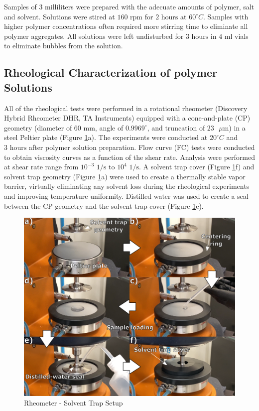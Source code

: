 Samples of 3 milliliters were prepared with the adecuate amounts of polymer, salt and solvent. Solutions were stired at $160 \textrm{ rpm}$ for $2 \textrm{ hours}$ at $60^{\circ}C$. Samples with higher polymer concentrations often required more stirring time to eliminate all polymer aggregates. All solutions were left undisturbed for $3 \textrm{ hours}$ in $4 \textrm{ ml}$ vials to eliminate bubbles from the solution.

\subsection{Rheological Characterization of polymer Solutions}
All of the rheological tests were performed in a rotational rheometer (Discovery Hybrid Rheometer DHR, TA Instruments) equipped with a cone-and-plate (CP) geometry (diameter of $60 \textrm{ mm}$, angle of $0.9969^{\circ}$, and truncation of $23 \textrm{ } \mu \textrm{m}$) in a steel Peltier plate (Figure \ref{fig:solventTrap}a). The experiments were conducted at $20^{\circ}C$ and $3 \textrm{ hours}$ after polymer solution preparation. Flow curve (FC) tests were conducted to obtain viscosity curves as a function of the shear rate. Analysis were performed at shear rate range from $10^{-3} \textrm{ 1} / \textrm{s}$ to $10^{4} \textrm{ 1} / \textrm{s}$. A solvent trap cover (Figure \ref{fig:solventTrap}f) and solvent trap geometry (Figure \ref{fig:solventTrap}a) were used to create a thermally stable vapor barrier, virtually eliminating any solvent loss during the rheological experiments and improving temperature uniformity. Distilled water was used to create a seal between the CP geometry and the solvent trap cover (Figure \ref{fig:solventTrap}e).

\begin{figure}[!th]
\centering
\includegraphics[scale=0.50]{./Figures/solventTrap.png}
\decoRule
\caption[Rheometer - Solvent Trap Setup]{Rheometer - Solvent Trap Setup}
\label{fig:solventTrap}
\end{figure}

